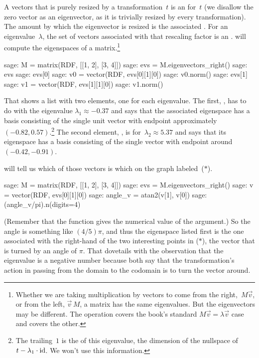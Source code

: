 A vectors that is  purely resized by a transformation~$t$  
is an  for~$t$ (we disallow the zero vector as an
eigenvector, as it is trivially resized
by every transformation).
The amount by which the eigenvector is 
resized is the associated .
For an eigenvalue~$\lambda$, the set of vectors associated with
that rescaling factor is an .
\Sage{} will compute the eigenspaces of a matrix.\footnote{%
  Whether we are taking multiplication 
  by vectors to come from the 
  right,~$M\vec{v}$, or from the left, $\vec{v}\,M$, 
  a matrix has the same eigenvalues.  
  But the eigenvectors may be different. 
  The \protect\Sage{} operation \protect{} 
  covers the book's standard
  $M\vec{v}=\lambda\vec{v}$ case and  
  \protect{}
  covers the other.}

\begin{sagecommandline}
sage: M = matrix(RDF, [[1, 2], [3, 4]])
sage: evs = M.eigenvectors_right()
sage: evs
sage: evs[0] 
sage: v0 = vector(RDF, evs[0][1][0])
sage: v0.norm()
sage: evs[1]
sage: v1 = vector(RDF, evs[1][1][0])
sage: v1.norm()
\end{sagecommandline}
That shows a list with two elements, one for each eigenvalue.
The first, , 
has to do with the eigenvalue $\lambda_1\approx -0.37$ and
says that the associated eigenspace has a basis consisting of the single unit
vector with endpoint approximately $(-0.82, 0.57)$.\footnote{%
  The trailing~$1$ is the \protect{} of this
  eigenvalue,
  the dimension of the nullspace of $t-\lambda_1\cdot\operatorname{id}$.
  We won't use this information.}
The second element, , 
is for~$\lambda_2\approx 5.37$
and says that its eigenspace
has a basis consisting of the single vector with endpoint around
$(-0.42, -0.91)$. 

\Sage{} will tell us which of those vectors is which on the graph 
labeled~($*$).
\begin{sagecommandline}
sage: M = matrix(RDF, [[1, 2], [3, 4]])
sage: evs = M.eigenvectors_right()
sage: v = vector(RDF, evs[0][1][0])
sage: angle_v = atan2(v[1], v[0]) 
sage: (angle_v/pi).n(digits=4) 
\end{sagecommandline}
(Remember that the  function gives the numerical value of
the argument.)
So the angle is something like $(4/5)\pi$, and thus
the eigenspace listed first is the one associated with the right-hand
of the two interesting points in ($*$), the vector that is turned by an angle
of $\pi$.
That dovetails with the observation that the eigenvalue is a negative number 
because both say that the transformation's action in passing from the
domain to the codomain is to turn the vector around.

